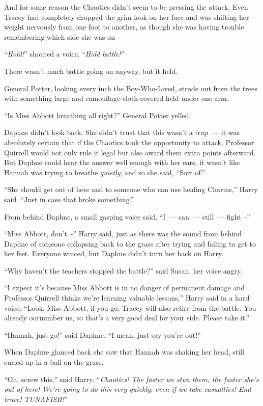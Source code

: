 And for some reason the Chaotics didn't seem to be pressing the attack. Even Tracey had completely dropped the grim look on her face and was shifting her weight nervously from one foot to another, as though she was having trouble remembering which side she was on -

``\emph{Hold!}'' shouted a voice. ``\emph{Hold battle!}''

There wasn't much battle going on anyway, but it held.

General Potter, looking every inch the Boy-Who-Lived, strode out from the trees with something large and camouflage-cloth-covered held under one arm.

``Is Miss Abbott breathing all right?'' General Potter yelled.

Daphne didn't look back. She didn't trust that this wasn't a trap~--- it was absolutely certain that if the Chaotics took the opportunity to attack, Professor Quirrell would not only rule it legal but also award them extra points afterward. But Daphne could hear the answer well enough with her ears, it wasn't like Hannah was trying to breathe \emph{quietly}, and so she said, ``Sort of.''

``She should get out of here and to someone who can use healing Charms,'' Harry said. ``Just in case that broke something.''

From behind Daphne, a small gasping voice said, ``I~--- can~--- still~--- fight~-''

``Miss Abbott, don't~-'' Harry said, just as there was the sound from behind Daphne of someone collapsing back to the grass after trying and failing to get to her feet. Everyone winced, but Daphne didn't turn her back on Harry.

``Why haven't the teachers stopped the battle?'' said Susan, her voice angry.

``I expect it's because Miss Abbott is in no danger of permanent damage and Professor Quirrell thinks we're learning valuable lessons,'' Harry said in a hard voice. ``Look, Miss Abbott, if you go, Tracey will also retire from the battle. You already outnumber us, so that's a very good deal for your side. Please take it.''

``Hannah, just go!'' said Daphne. ``I mean, just say you're out!''

When Daphne glanced back she saw that Hannah was shaking her head, still curled up in a ball on the grass.

``Oh, screw this,'' said Harry. ``\emph{Chaotics! The faster we stun them, the faster she's out of here! We're going to do this very quickly, even if we take casualties! End truce! TUNAFISH!}''

